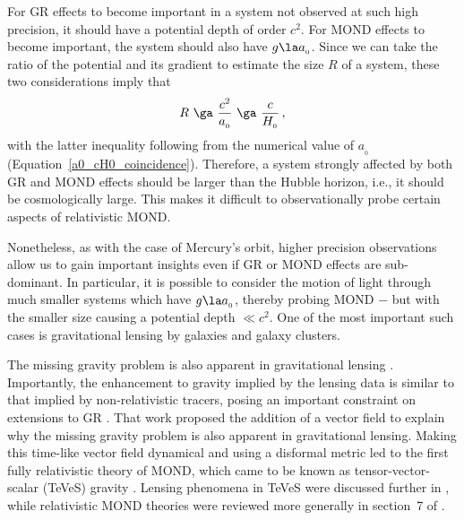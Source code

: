 \documentclass[fleqn,usenatbib,useAMS,onecolumn]{mnras} %
\begin{document}
For GR effects to become important in a system not observed at such high precision, it should have a potential depth of order $c^2$. For MOND effects to become important, the system should also have $g \la a_{_0}$. Since we can take the ratio of the potential and its gradient to estimate the size $R$ of a system, these two considerations imply that
\begin{eqnarray}
	R ~\ga~ \frac{c^2}{a_{_0}} ~\ga~ \frac{c}{H_{_0}} \, ,
\end{eqnarray}
with the latter inequality following from the numerical value of $a_{_0}$ (Equation~\ref{a0_cH0_coincidence}). Therefore, a system strongly affected by both GR and MOND effects should be larger than the Hubble horizon, i.e., it should be cosmologically large. This makes it difficult to observationally probe certain aspects of relativistic MOND.

Nonetheless, as with the case of Mercury's orbit, higher precision observations allow us to gain important insights even if GR or MOND effects are sub-dominant. In particular, it is possible to consider the motion of light through much smaller systems which have $g \la a_{_0}$, thereby probing MOND $-$ but with the smaller size causing a potential depth $\ll c^2$. One of the most important such cases is gravitational lensing by galaxies and galaxy clusters.

The missing gravity problem is also apparent in gravitational lensing \citep[section~4.2 of][]{Fort_1994}. Importantly, the enhancement to gravity implied by the lensing data is similar to that implied by non-relativistic tracers, posing an important constraint on extensions to GR \citep{Sanders_1997}. That work proposed the addition of a vector field to explain why the missing gravity problem is also apparent in gravitational lensing. Making this time-like vector field dynamical and using a disformal metric led to the first fully relativistic theory of MOND, which came to be known as tensor-vector-scalar (TeVeS) gravity \citep{Bekenstein_2004}. Lensing phenomena in TeVeS were discussed further in \citet{Zhao_2006_lensing}, while relativistic MOND theories were reviewed more generally in section~7 of \citet{Famaey_McGaugh_2012}.
\end{document}
